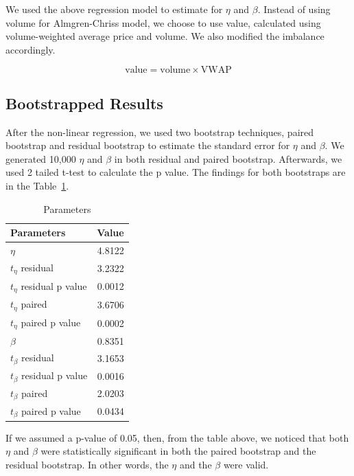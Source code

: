\documentclass{article}
\begin{document}
We used the above regression model to estimate for $\eta$ and $\beta$. Instead of using volume for Almgren-Chriss model, we choose to use value, calculated using volume-weighted average price and volume. We also modified the imbalance accordingly. 

$$\text{value} = \text{volume} \times \text{VWAP}$$
\subsection{Bootstrapped Results}

After the non-linear regression, we used two bootstrap techniques, paired bootstrap and residual bootstrap to estimate the standard error for $\eta$ and $\beta$. We generated 10,000 $\eta$ and $\beta$ in both residual and paired bootstrap. Afterwards, we used 2 tailed t-test to calculate the p value. The findings for both bootstraps are in the Table~\ref{tab:params}.

\begin{table}[ht]
\centering
\begin{tabular}{l|r}
Parameters & Value \\\hline
$\eta$ & 4.8122 \\
$ t_{\eta}$  residual & 3.2322 \\
$ t_{\eta}$ residual p value  & 0.0012 \\ 
$ t_{\eta}$  paired & 3.6706 \\
$ t_{\eta}$ paired p value  & 0.0002\\\hline 
$\beta$ & 0.8351 \\
$t_{\beta}$ residual & 3.1653 \\
$t_{\beta}$ residual p value & 0.0016 \\
$t_{\beta}$ paired & 2.0203 \\
$t_{\beta}$ paired p value & 0.0434 \\
\end{tabular}
\caption{\label{tab:params}Parameters}
\end{table}

If we assumed a p-value of 0.05, then, from the table above, we noticed that both $\eta$ and $\beta$ were statistically significant in both the paired bootstrap and the residual bootstrap. In other words, the $\eta$ and the $\beta$ were valid.
\end{document}
